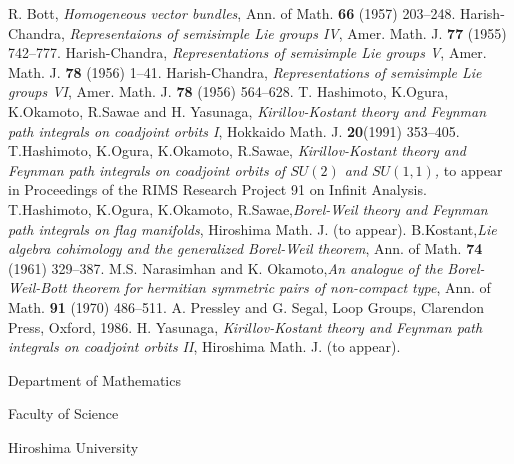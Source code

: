 \begin{thebibliography}{99}
 R. Bott, \textit{Homogeneous vector bundles}, Ann. of Math. {\bf 66} (1957) 203--248.
 Harish-Chandra, \textit{Representaions of semisimple Lie groups IV}, Amer. Math. J. {\bf 77} (1955) 742--777.
 Harish-Chandra, \textit{Representations of semisimple Lie groups V}, Amer. Math. J. {\bf 78} (1956) 1--41.
 Harish-Chandra, \textit{Representations of semisimple Lie groups VI}, Amer. Math. J. {\bf 78} (1956) 564--628.
 T. Hashimoto, K.Ogura, K.Okamoto, R.Sawae and H. Yasunaga, \textit{Kirillov-Kostant theory and Feynman path integrals on coadjoint orbits I}, Hokkaido Math. J. {\bf 20}(1991) 353--405.
 T.Hashimoto, K.Ogura, K.Okamoto, R.Sawae, \textit{Kirillov-Kostant theory and Feynman path integrals on coadjoint orbits of $SU(2)$ and $SU(1,1)$,} to appear in Proceedings of the RIMS Research Project 91 on Infinit Analysis.
T.Hashimoto, K.Ogura, K.Okamoto, R.Sawae,\textit{Borel-Weil theory and Feynman path integrals on flag manifolds}, Hiroshima Math. J. (to appear). 
 B.Kostant,\pageoriginale \textit{Lie algebra cohimology and the generalized Borel-Weil theorem}, Ann. of Math.
{\bf 74} (1961) 329--387.
 M.S. Narasimhan  and K. Okamoto,\textit{An analogue of the Borel-Weil-Bott theorem for hermitian symmetric pairs of non-compact type}, Ann. of Math. {\bf 91} (1970) 486--511.
 A. Pressley and G. Segal, Loop Groups, Clarendon Press, Oxford, 1986.
H. Yasunaga, \textit{Kirillov-Kostant theory and Feynman path integrals on coadjoint orbits II}, Hiroshima Math. J. (to appear).
\end{thebibliography}

\bigskip

\begin{flushleft}
Department of Mathematics

Faculty of Science

Hiroshima University
\end{flushleft}
